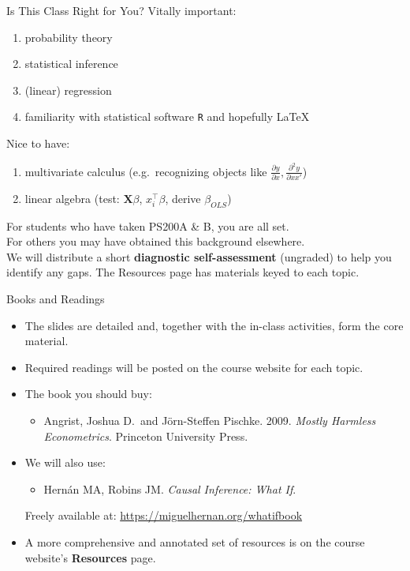 \documentclass[handout,xcolor=dvipsnames,pdftex,hyperref={colorlinks=false}]{beamer}
\newcommand\makebiggaps{\addtolength{\itemsep}{.5\baselineskip}}
\newcommand\X{{\bm X}}
\begin{document}
\begin{frame}{Is This Class Right for You?}
\small
{} Vitally important: \\
\begin{enumerate}
   \item<2-> probability theory
   \item<3-> statistical inference
   \item<4-> (linear) regression
   \item<5-> familiarity with statistical software \texttt{R} and hopefully \LaTeX
\end{enumerate}
 Nice to have:
\begin{enumerate}
   \item<7-> multivariate calculus (e.g.\ recognizing objects like $\frac{\partial y}{\partial x}, \frac{\partial^2 y}{\partial xx'}$)\small
   \item<8-> linear algebra \scriptsize (test: $\X\beta$, $x_i^{\top}\beta$, derive $\beta_{OLS}$)\small
\end{enumerate}
\smallskip
{} For students who have taken PS200A \& B, you are all set.  \\
\smallskip
{} For others you may have obtained this background elsewhere. \\
\smallskip
{} We will distribute a short \textbf{diagnostic self-assessment} (ungraded) to help you identify any gaps. The Resources page has materials keyed to each topic.\\
\smallskip
\end{frame}


\begin{frame}{Books and Readings}
\begin{itemize}
\makebiggaps
\small
\item<1-> The slides are detailed and, together with the in-class activities, form the core material.
\item<2-> Required readings will be posted on the course website for each topic.
\item<3-> The book you should buy:
  \begin{itemize}
  \item Angrist, Joshua D.\ and J\"orn-Steffen Pischke. 2009. \textit{Mostly Harmless Econometrics}. Princeton University Press.
  \end{itemize}
\item<4-> We will also use:
  \begin{itemize}
  \item Hern\'an MA, Robins JM. \textit{Causal Inference: What If}.
  \end{itemize}
  Freely available at: \scriptsize \url{https://miguelhernan.org/whatifbook}
\normalsize
\item<5-> A more comprehensive and annotated set of resources is on the course website's \textbf{Resources} page.
\end{itemize}
\end{frame}
\end{document}
